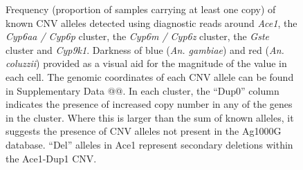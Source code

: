 \documentclass[a4paper,12pt]{article}
\begin{document}
\begin{figure}[h]
\begin{center}
		\vskip 0.4cm
	\end{center}
	\caption{\footnotesize Frequency (proportion of samples carrying at least one copy) of known CNV alleles detected using diagnostic reads around \textit{Ace1}, the \textit{Cyp6aa / Cyp6p} cluster, the \textit{Cyp6m / Cyp6z} cluster, the \textit{Gste} cluster and \textit{Cyp9k1}. Darkness of blue (\textit{An. gambiae}) and red (\textit{An. coluzzii}) provided as a visual aid for the magnitude of the value in each cell. The genomic coordinates of each CNV allele can be found in Supplementary Data @@. In each cluster, the ``Dup0'' column indicates the presence of increased copy number in any of the genes in the cluster. Where this is larger than the sum of known alleles, it suggests the presence of CNV alleles not present in the Ag1000G database. ``Del'' alleles in Ace1 represent secondary deletions within the Ace1-Dup1 CNV.}
	\label{FigS1}
\end{figure}

\clearpage
\end{document}
